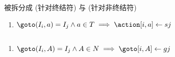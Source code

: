 \begin{frame}{}
  \begin{center}

    \vspace{0.30cm}
  \end{center}
\end{frame}

\begin{frame}{}
  \begin{center}

    \begin{columns}
        
    \end{columns}

    \vspace{0.20cm}
    被拆分成  {\small (针对终结符)}
    与  {\small (针对非终结符)}
  \end{center}
\end{frame}

\begin{frame}{}
  \begin{center}
    \begin{enumerate}[(1)]
      \centering
      \item $\goto(I_{i}, a) = I_{j} \land a \in T \implies \action[i, a] \gets sj$
    \end{enumerate}

    \begin{columns}
        
    \end{columns}

    \vspace{0.20cm}
    \begin{enumerate}[(2)]
      \centering
      \item $\goto(I_{i}, A) = I_{j} \land A \in N \implies \goto[i, A] \gets gj$
    \end{enumerate}
  \end{center}
\end{frame}

